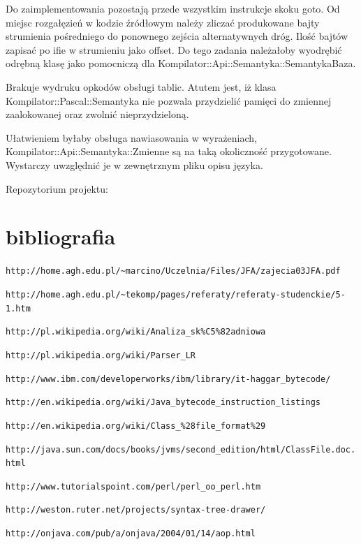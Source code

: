\documentclass[a4paper,12pt]{article}
\begin{document}
Do zaimplementowania pozostają przede wszystkim instrukcje skoku goto. Od miejsc rozgałęzień w kodzie źródłowym należy zliczać produkowane bajty strumienia pośredniego do ponownego zejścia alternatywnych dróg. Ilość bajtów zapisać po ifie w strumieniu jako offset. Do tego zadania należałoby wyodrębić odrębną klasę jako pomocniczą dla Kompilator::Api::Semantyka::SemantykaBaza.

Brakuje wydruku opkodów obsługi tablic. Atutem jest, iż klasa Kompilator::Pascal::Semantyka nie pozwala przydzielić pamięci do zmiennej zaalokowanej oraz zwolnić nieprzydzieloną.

Ułatwieniem byłaby obsługa nawiasowania w wyrażeniach, Kompilator::Api::Semantyka::Zmienne są na taką okoliczność przygotowane. Wystarczy uwzględnić je w zewnętrznym pliku opisu języka.


Repozytorium projektu:
\begin{center}
\end{center}


\newpage
\section{bibliografia}
\begin{description}
	\item \verb|http://home.agh.edu.pl/~marcino/Uczelnia/Files/JFA/zajecia03JFA.pdf|
	\item \verb|http://home.agh.edu.pl/~tekomp/pages/referaty/referaty-studenckie/5-1.htm|
	\item \verb|http://pl.wikipedia.org/wiki/Analiza_sk%C5%82adniowa|
	\item \verb|http://pl.wikipedia.org/wiki/Parser_LR|
	\item \verb|http://www.ibm.com/developerworks/ibm/library/it-haggar_bytecode/|
	\item \verb|http://en.wikipedia.org/wiki/Java_bytecode_instruction_listings|
	\item \verb|http://en.wikipedia.org/wiki/Class_%28file_format%29|
	\item \verb|http://java.sun.com/docs/books/jvms/second_edition/html/ClassFile.doc.html|
	\item \verb|http://www.tutorialspoint.com/perl/perl_oo_perl.htm|
	\item \verb|http://weston.ruter.net/projects/syntax-tree-drawer/|
	\item \verb|http://onjava.com/pub/a/onjava/2004/01/14/aop.html|
\end{description}
\end{document}
